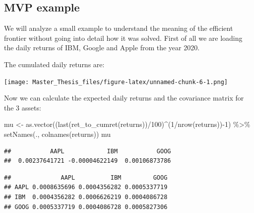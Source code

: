 \documentclass[
  oneside]{book}
\newenvironment{Shaded}{\begin{snugshade}}{\end{snugshade}}
\newcommand{\DecValTok}[1]{\textcolor[rgb]{0.00,0.00,0.81}{#1}}
\newcommand{\FunctionTok}[1]{\textcolor[rgb]{0.00,0.00,0.00}{#1}}
\newcommand{\NormalTok}[1]{#1}
\newcommand{\OtherTok}[1]{\textcolor[rgb]{0.56,0.35,0.01}{#1}}
\newcommand{\SpecialCharTok}[1]{\textcolor[rgb]{0.00,0.00,0.00}{#1}}
\begin{document}
\hypertarget{mvp-example}{%
\subsection{MVP example}\label{mvp-example}}

We will analyze a small example to understand the meaning of the efficient frontier without going into detail how it was solved. First of all we are loading the daily returns of IBM, Google and Apple from the year 2020.

The cumulated daily returns are:

\texttt{[image: Master\_Thesis\_files/figure-latex/unnamed-chunk-6-1.png]}

Now we can calculate the expected daily returns and the covariance matrix for the 3 assets:

\begin{Shaded}
\begin{Highlighting}[]
\NormalTok{mu }\OtherTok{\textless{}{-}} \FunctionTok{as.vector}\NormalTok{((}\FunctionTok{last}\NormalTok{(}\FunctionTok{ret\_to\_cumret}\NormalTok{(returns))}\SpecialCharTok{/}\DecValTok{100}\NormalTok{)}\SpecialCharTok{\^{}}\NormalTok{(}\DecValTok{1}\SpecialCharTok{/}\FunctionTok{nrow}\NormalTok{(returns))}\SpecialCharTok{{-}}\DecValTok{1}\NormalTok{) }\SpecialCharTok{\%\textgreater{}\%} 
  \FunctionTok{setNames}\NormalTok{(., }\FunctionTok{colnames}\NormalTok{(returns))}
\NormalTok{mu}
\end{Highlighting}
\end{Shaded}

\begin{verbatim}
##           AAPL            IBM           GOOG 
##  0.00237641721 -0.00004622149  0.00106873786
\end{verbatim}

\begin{Shaded}
\end{Shaded}

\begin{verbatim}
##              AAPL          IBM         GOOG
## AAPL 0.0008635696 0.0004356282 0.0005337719
## IBM  0.0004356282 0.0006626219 0.0004086728
## GOOG 0.0005337719 0.0004086728 0.0005827306
\end{verbatim}
\end{document}

